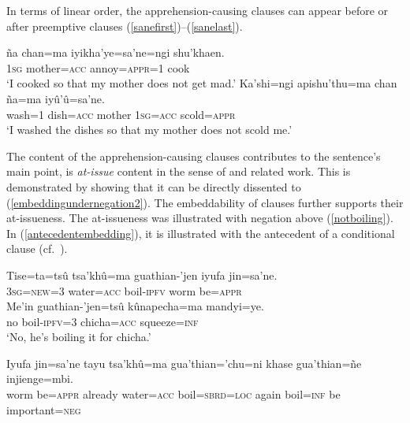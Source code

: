 \documentclass[output=paper,colorlinks,citecolor=brown]{langscibook}
\begin{document}
\fi

In terms of linear order, the apprehension-causing  clauses can appear before or after preemptive clauses (\ref{sanefirst})--(\ref{sanelast}).
\begin{exe}
    \ex \label{sanefirst} %
    \gll {\ob}ña    chan=ma    iyikha'ye=sa'ne{\cb}=ngi shu'khaen. \\
         \textsc{1sg} mother=\textsc{acc} annoy=\textsc{appr=1} cook \\
    \glt `I cooked so that my mother does not get mad.'
    \ex \label{sanelast}
    \gll Ka'shi=ngi apishu'thu=ma {\ob}chan   ña=ma    iyû'û=sa'ne.{\cb} \\
         wash=\textsc{1}  dish=\textsc{acc}   mother \textsc{1sg=acc} scold=\textsc{appr} \\
    \glt `I washed the dishes so that my mother does not scold me.'
\end{exe}

\largerpage
The content of the apprehension-causing  clauses contributes to the sentence's main point, \ie is \textit{at-issue} content in the sense of \citet{simons2010projects} and related work. This is demonstrated by showing that it can be directly dissented to (\ref{embeddingundernegation2}). The embeddability of  clauses further supports their at-issueness. The at-issueness was illustrated with negation above (\ref{notboiling}). In (\ref{antecedentembedding}), it is illustrated with the antecedent of a conditional clause (cf.\ \citealt{tonhauser2012diagnosing}).
    \begin{exe} 
        \ex \label{embeddingundernegation2} \begin{xlist}
            \gll Tise=ta=tsû tsa'khû=ma guathian-'jen {\ob}iyufa jin=sa'ne.{\cb}  \\
                 \textsc{3sg=new=3} water=\textsc{acc} boil-\textsc{ipfv} worm be=\textsc{appr}    \\
            \gll  Me'in guathian-'jen=tsû {\ob}kûnapecha=ma mandyi=ye.{\cb}  \\
              no boil-\textsc{ipfv=3} chicha=\textsc{acc} squeeze=\textsc{inf}  \\
            \glt `No, he's boiling it for chicha.'
        \end{xlist}
        \ex \label{antecedentembedding}
    \gll {\ob}{\ob}Iyufa {jin=sa'ne{\cb}} tayu tsa'khû=ma {gua'thian='chu=ni{\cb}} khase gua'thian=ñe injienge=mbi. \\
         worm be=\textsc{appr} already water=\textsc{acc} boil=\textsc{sbrd=loc} again boil=\textsc{inf}     {be important=\textsc{neg}} \\
    \end{exe}
\end{document}
